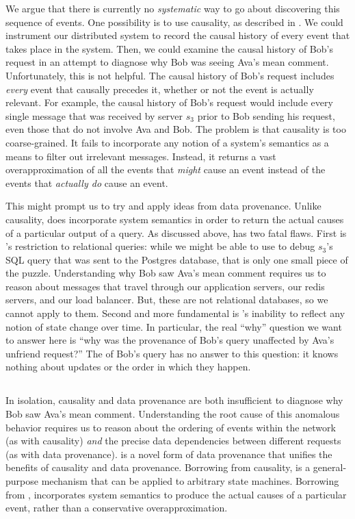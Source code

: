 We argue that there is currently no \emph{systematic} way to go about
discovering this sequence of events. One possibility is to use causality, as
described in . We could instrument our distributed system to
record the causal history of every event that takes place in the system. Then,
we could examine the causal history of Bob's request in an attempt to diagnose
why Bob was seeing Ava's mean comment. Unfortunately, this is not helpful. The
causal history of Bob's request includes \emph{every} event that causally
precedes it, whether or not the event is actually relevant. For example, the
causal history of Bob's request would include every single message that was
received by server $s_3$ prior to Bob sending his request, even those that do
not involve Ava and Bob. The problem is that causality is too coarse-grained.
It fails to incorporate any notion of a system's semantics as a means to filter
out irrelevant messages.  Instead, it returns a vast overapproximation of all
the events that \emph{might} cause an event instead of the events that
\emph{actually do} cause an event.

This might prompt us to try and apply ideas from data provenance. Unlike
causality, \whyprovenance{} does incorporate system semantics in order to
return the actual causes of a particular output of a query. As discussed
above, \whyprovenance{} has two fatal flaws.  First is \whyprovenance{}'s
restriction to relational queries: while we might be able to use
\whyprovenance{} to debug $s_3$'s SQL query that was sent to the Postgres
database, that is only one small piece of the puzzle.  Understanding why Bob
saw Ava's mean comment requires us to reason about messages that travel through
our application servers, our redis servers, and our load balancer. But, these
are not relational databases, so we cannot apply \whyprovenance{} to them.
Second and more fundamental is \whyprovenance{}'s inability to reflect any
notion of state change over time.  In particular, the real ``why'' question we
want to answer here is ``why was the provenance of Bob's query unaffected by
Ava's unfriend request?'' The \whyprovenance{} of Bob's query has no answer to
this question: it knows nothing about updates or the order in which they
happen.

\subsection{\WatProvenance{}}
In isolation, causality and data provenance are both insufficient to diagnose
why Bob saw Ava's mean comment. Understanding the root cause of this anomalous
behavior requires us to reason about the ordering of events within the network
(as with causality) \emph{and} the precise data dependencies between different
requests (as with data provenance).
%
 is a novel form of data provenance that unifies the
benefits of causality and data provenance. Borrowing from causality,
\watprovenance{} is a general-purpose mechanism that can be applied to
arbitrary state machines. Borrowing from \whyprovenance{}, \watprovenance{}
incorporates system semantics to produce the actual causes of a particular
event, rather than a conservative overapproximation.

